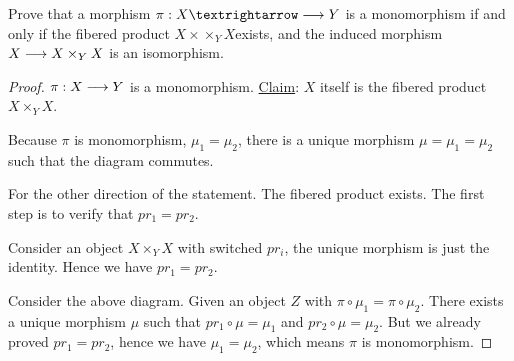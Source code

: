 \documentclass[11pt]{book} %
\begin{document}
\begin{exr}
Prove that a morphism $\pi: X →\lrta Y$ is a monomorphism if and only if the fibered product $X ×\times_Y X $exists, and the induced morphism $X \longrightarrow  X \times_Y X$ is an isomorphism.
\end{exr}
\begin{proof}
$\pi:X\longrightarrow Y$ is a monomorphism. \underline{Claim}: $X$ itself is the fibered product $X\times_Y X$.
\begin{center}
\end{center}
Because $\pi$ is monomorphism, $\mu_1=\mu_2$, there is a unique morphism $\mu=\mu_1=\mu_2$ such that the diagram commutes.

For the other direction of the statement. The fibered product exists. The first step is to verify that $pr_1=pr_2$.
\begin{center}
\end{center}
Consider an object $X\times_Y X$ with switched $pr_i$, the unique morphism is just the identity. Hence we have $pr_1=pr_2$.

\begin{center}
\end{center}
Consider the above diagram. Given an object $Z$ with $\pi\circ\mu_1=\pi\circ \mu_2$. There exists a unique morphism $\mu$ such that $pr_1\circ\mu=\mu_1$ and $pr_2\circ \mu=\mu_2$. But we already proved $pr_1=pr_2$, hence we have $\mu_1=\mu_2$, which means $\pi$ is monomorphism.
\end{proof}
\end{document}
